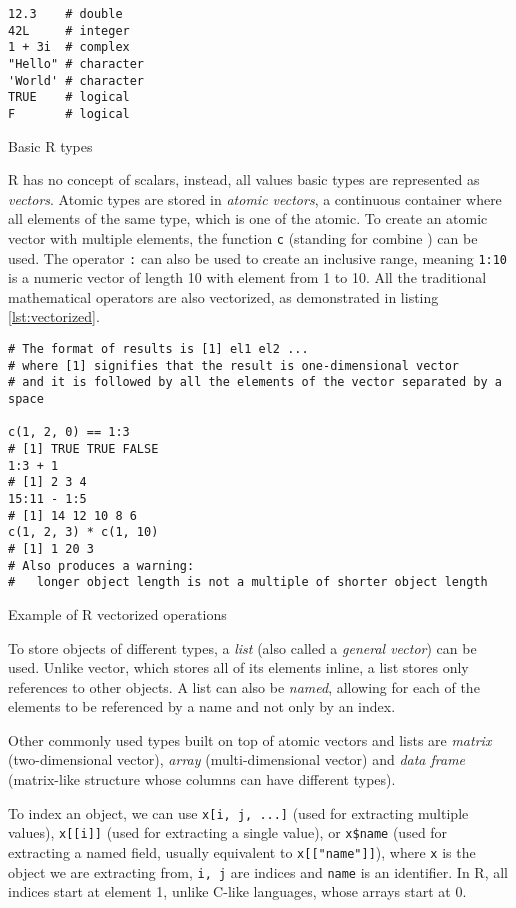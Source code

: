 \begin{listing}[h!]
	\centering
	\begin{verbatim}
12.3    # double
42L     # integer
1 + 3i  # complex
"Hello" # character
'World' # character
TRUE    # logical
F       # logical
    \end{verbatim}
	\caption{Basic R types}\label{lst:rtypes}
\end{listing}

R has no concept of scalars, instead, all values basic types are represented as \textit{vectors}. Atomic types are stored in \textit{atomic vectors}, a continuous container where all elements of the same type, which is one of the atomic. To create an atomic vector with multiple elements, the function \texttt{c} (standing for combine ) can be used. The operator \texttt{:} can also be used to create an inclusive range, meaning \texttt{1:10} is a numeric vector of length 10 with element from 1 to 10. All the traditional mathematical operators are also vectorized, as demonstrated in listing \ref{lst:vectorized}.

\begin{listing}[h!]
	\centering
	\begin{verbatim}
# The format of results is [1] el1 el2 ...
# where [1] signifies that the result is one-dimensional vector
# and it is followed by all the elements of the vector separated by a space

c(1, 2, 0) == 1:3
# [1] TRUE TRUE FALSE
1:3 + 1
# [1] 2 3 4
15:11 - 1:5
# [1] 14 12 10 8 6
c(1, 2, 3) * c(1, 10)
# [1] 1 20 3
# Also produces a warning:
#   longer object length is not a multiple of shorter object length
    \end{verbatim}
	\caption{Example of R vectorized operations}\label{lst:vectorized}
\end{listing}

To store objects of different types, a \textit{list} (also called a \textit{general vector}) can be used. Unlike vector, which stores all of its elements inline, a list stores only references to other objects. A list can also be \textit{named}, allowing for each of the elements to be referenced by a name and not only by an index.

Other commonly used types built on top of atomic vectors and lists are \textit{matrix} (two-dimensional vector), \textit{array} (multi-dimensional vector) and \textit{data frame} (matrix-like structure whose columns can have different types).

To index an object, we can use \texttt{x[i, j, ...]} (used for extracting multiple values), \texttt{x[[i]]} (used for extracting a single value), or \texttt{x\$name} (used for extracting a named field, usually equivalent to \texttt{x[["name"]]}), where \texttt{x} is the object we are extracting from, \texttt{i, j} are indices and \texttt{name} is an identifier. In R, all indices start at element 1, unlike C-like languages, whose arrays start at 0.

